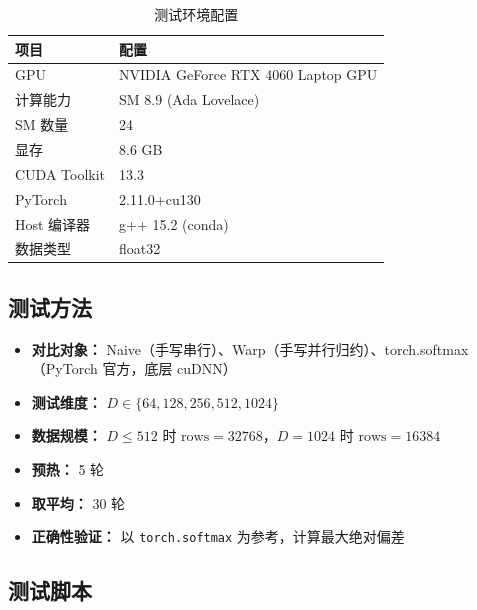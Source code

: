 \documentclass[12pt,a4paper]{ctexart}
\begin{document}
\begin{table}[H]
\centering
\caption{测试环境配置}
\begin{tabular}{ll}
\toprule
\textbf{项目} & \textbf{配置} \\
\midrule
GPU & NVIDIA GeForce RTX 4060 Laptop GPU \\
计算能力 & SM 8.9 (Ada Lovelace) \\
SM 数量 & 24 \\
显存 & 8.6 GB \\
CUDA Toolkit & 13.3 \\
PyTorch & 2.11.0+cu130 \\
Host 编译器 & g++ 15.2 (conda) \\
数据类型 & float32 \\
\bottomrule
\end{tabular}
\end{table}

\subsection{测试方法}

\begin{itemize}[itemsep=3pt]
    \item \textbf{对比对象：} Naive（手写串行）、Warp（手写并行归约）、torch.softmax（PyTorch 官方，底层 cuDNN）
    \item \textbf{测试维度：} $D \in \{64, 128, 256, 512, 1024\}$
    \item \textbf{数据规模：} $D \leq 512$ 时 $\text{rows} = 32768$，$D = 1024$ 时 $\text{rows} = 16384$
    \item \textbf{预热：} 5 轮
    \item \textbf{取平均：} 30 轮
    \item \textbf{正确性验证：} 以 \texttt{torch.softmax} 为参考，计算最大绝对偏差
\end{itemize}

\subsection{测试脚本}
\end{document}
